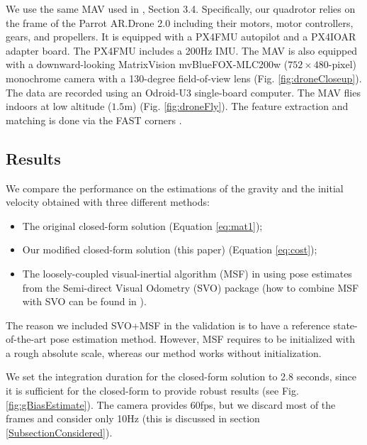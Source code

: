 \documentclass[letterpaper, 10 pt, conference]{ieeeconf}  %
\begin{document}
We use the same MAV used in \cite{FaesslerICRA15}, Section 3.4.
Specifically, our quadrotor relies on the frame of the Parrot AR.Drone 2.0 including their motors, motor controllers, gears, and propellers.
It is equipped with a PX4FMU autopilot and a PX4IOAR adapter board.
The PX4FMU includes a 200Hz IMU.
The MAV is also equipped with a downward-looking MatrixVision mvBlueFOX-MLC200w ($752 \times 480$-pixel) monochrome camera with a 130-degree field-of-view lens (Fig. \ref{fig:droneCloseup}).
The data are recorded using an Odroid-U3 single-board computer.
The MAV flies indoors at low altitude ($1.5$m) (Fig. \ref{fig:droneFly}).
The feature extraction and matching is done via the FAST corners \cite{Rosten2005}\cite{Rosten2006}.

\subsection{Results}

We compare the performance on the estimations of the gravity and the initial velocity obtained with three different methods:
\begin{itemize}
\item The original closed-form solution \cite{Martinelli2014} (Equation \ref{eq:mat1});
\item Our modified closed-form solution (this paper) (Equation \ref{eq:cost});
\item The loosely-coupled visual-inertial algorithm (MSF) in \cite{LynenIROS13} using pose estimates from the Semi-direct Visual Odometry (SVO) package \cite{Forster2014} (how to combine MSF \cite{LynenIROS13} with SVO can be found in \cite{FaesslerICRA15}).
\end{itemize}
The reason we included SVO+MSF in the validation is to have a reference state-of-the-art pose estimation method.
However, MSF requires to be initialized with a rough absolute scale, whereas our method works without initialization.

We set the integration duration for the closed-form solution to 2.8 seconds, since it is sufficient for the closed-form to provide robust results (see Fig. \ref{fig:gBiasEstimate}).
The camera provides 60fps, but we discard most of the frames and consider only 10Hz (this is discussed in section \ref{SubsectionConsidered}).
\end{document}
